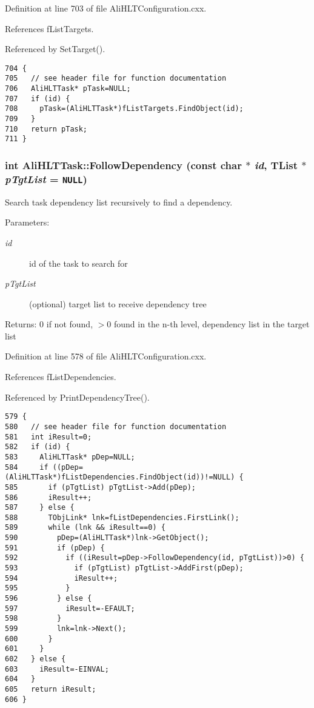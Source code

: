 Definition at line 703 of file Ali\-HLTConfiguration.cxx.

References f\-List\-Targets.

Referenced by Set\-Target().

\footnotesize\begin{verbatim}704 {
705   // see header file for function documentation
706   AliHLTTask* pTask=NULL;
707   if (id) {
708     pTask=(AliHLTTask*)fListTargets.FindObject(id);
709   }
710   return pTask;
711 }
\end{verbatim}\normalsize 


\subsubsection{\setlength{\rightskip}{0pt plus 5cm}int Ali\-HLTTask::Follow\-Dependency (const char $\ast$ {\em id}, TList $\ast$ {\em p\-Tgt\-List} = {\tt NULL})}\label{classAliHLTTask_a26}


Search task dependency list recursively to find a dependency. \begin{Desc}
\item[Parameters:]
\begin{description}
\item[{\em id}]id of the task to search for \item[{\em p\-Tgt\-List}](optional) target list to receive dependency tree \end{description}
\end{Desc}
\begin{Desc}
\item[Returns:]0 if not found, $>$0 found in the n-th level, dependency list in the target list \end{Desc}


Definition at line 578 of file Ali\-HLTConfiguration.cxx.

References f\-List\-Dependencies.

Referenced by Print\-Dependency\-Tree().

\footnotesize\begin{verbatim}579 {
580   // see header file for function documentation
581   int iResult=0;
582   if (id) {
583     AliHLTTask* pDep=NULL;
584     if ((pDep=(AliHLTTask*)fListDependencies.FindObject(id))!=NULL) {
585       if (pTgtList) pTgtList->Add(pDep);
586       iResult++;
587     } else {
588       TObjLink* lnk=fListDependencies.FirstLink();
589       while (lnk && iResult==0) {
590         pDep=(AliHLTTask*)lnk->GetObject();
591         if (pDep) {
592           if ((iResult=pDep->FollowDependency(id, pTgtList))>0) {
593             if (pTgtList) pTgtList->AddFirst(pDep);
594             iResult++;
595           }
596         } else {
597           iResult=-EFAULT;
598         }
599         lnk=lnk->Next();
600       }
601     }
602   } else {
603     iResult=-EINVAL;
604   }
605   return iResult;
606 }
\end{verbatim}\normalsize 



